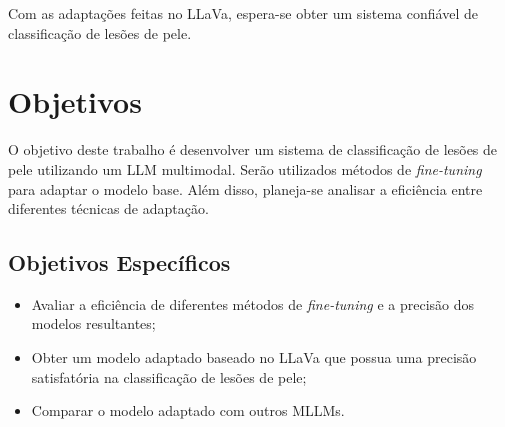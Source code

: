 Com as adaptações feitas no \ac{LLaVa}, espera-se obter um sistema confiável de classificação de lesões de pele.

\section{Objetivos}

O objetivo deste trabalho é desenvolver um sistema de classificação de lesões de pele utilizando um \ac{LLM} multimodal. Serão utilizados métodos de \textit{fine-tuning}
para adaptar o modelo base. Além disso, planeja-se analisar a eficiência entre diferentes técnicas de adaptação.

\subsection*{Objetivos Específicos}

\begin{itemize}
    \item Avaliar a eficiência de diferentes métodos de \textit{fine-tuning} e a precisão dos modelos resultantes;
    \item Obter um modelo adaptado baseado no \ac{LLaVa} que possua uma precisão satisfatória na classificação de lesões de pele;
    \item Comparar o modelo adaptado com outros \ac{MLLMs}.
\end{itemize}
